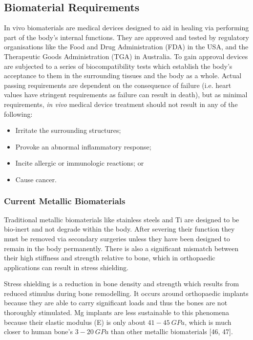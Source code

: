 \documentclass[a4paper,12pt,oneside]{report}%
\begin{document}
\subsection{Biomaterial Requirements} 
In vivo biomaterials are medical devices designed to aid in healing via performing part of the body's internal functions. They are approved and tested by regulatory organisations like the Food and Drug Administration (FDA) in the USA, and the Therapeutic Goods Administration (TGA) in Australia. To gain approval devices are subjected to a series of biocompatibility tests which establish the body's acceptance to them in the surrounding tissues and the body as a whole. Actual passing requirements are dependent on the consequence of failure (i.e. heart values have stringent requirements as failure can result in death), but as minimal requirements, \textit{in vivo} medical device treatment should not result in any of the following:

\begin{itemize}
	\item Irritate the surrounding structures;
	\item Provoke an abnormal inflammatory response;
	\item Incite allergic or immunologic reactions; or
	\item Cause cancer.  
\end{itemize}

\subsubsection{Current Metallic Biomaterials}
Traditional metallic biomaterials like stainless steels and Ti are designed to be bio-inert and not degrade within the body. After severing their function they must be removed via secondary surgeries unless they have been designed to remain in the body permanently. There is also a significant mismatch between their high stiffness and strength relative to bone, which in orthopaedic applications can result in stress shielding.

Stress shielding is a reduction in bone density and strength which results from reduced stimulus during bone remodelling. It occurs around orthopaedic implants because they are able to carry significant loads and thus the bones are not thoroughly stimulated. Mg implants are less sustainable to this phenomena because their elastic modulus (E) is only about $41 - 45~ GPa$, which is much closer to human bone's $3 - 20~ GPa$ than other metallic biomaterials [46, 47].
\end{document}
